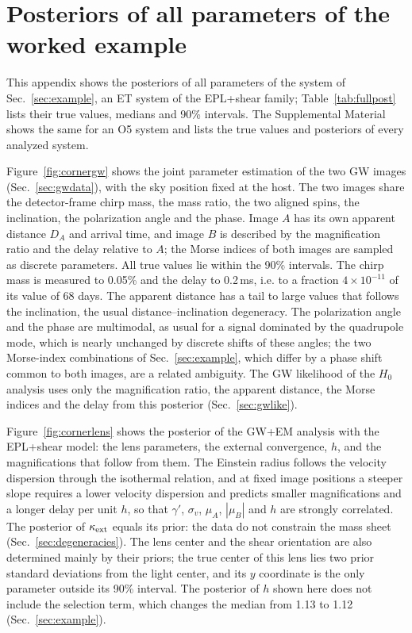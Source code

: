 \section{Posteriors of all parameters of the worked example}
\label{app:example}
This appendix shows the posteriors of all parameters of the system of Sec.~\ref{sec:example}, an ET system of the EPL+shear family; Table~\ref{tab:fullpost} lists their true values, medians and 90\% intervals. The Supplemental Material~\cite{supplement} shows the same for an O5 system and lists the true values and posteriors of every analyzed system.

Figure~\ref{fig:cornergw} shows the joint parameter estimation of the two GW images (Sec.~\ref{sec:gwdata}), with the sky position fixed at the host. The two images share the detector-frame chirp mass, the mass ratio, the two aligned spins, the inclination, the polarization angle and the phase. Image $A$ has its own apparent distance $D_A$ and arrival time, and image $B$ is described by the magnification ratio and the delay relative to $A$; the Morse indices of both images are sampled as discrete parameters. All true values lie within the 90\% intervals. The chirp mass is measured to 0.05\% and the delay to 0.2\,ms, i.e. to a fraction $4\times10^{-11}$ of its value of 68 days. The apparent distance has a tail to large values that follows the inclination, the usual distance--inclination degeneracy. The polarization angle and the phase are multimodal, as usual for a signal dominated by the quadrupole mode, which is nearly unchanged by discrete shifts of these angles; the two Morse-index combinations of Sec.~\ref{sec:example}, which differ by a phase shift common to both images, are a related ambiguity. The GW likelihood of the $H_0$ analysis uses only the magnification ratio, the apparent distance, the Morse indices and the delay from this posterior (Sec.~\ref{sec:gwlike}).

Figure~\ref{fig:cornerlens} shows the posterior of the GW+EM analysis with the EPL+shear model: the lens parameters, the external convergence, $h$, and the magnifications that follow from them. The Einstein radius follows the velocity dispersion through the isothermal relation, and at fixed image positions a steeper slope requires a lower velocity dispersion and predicts smaller magnifications and a longer delay per unit $h$, so that $\gamma'$, $\sigma_v$, $\mu_A$, $|\mu_B|$ and $h$ are strongly correlated. The posterior of $\kappa_{\rm ext}$ equals its prior: the data do not constrain the mass sheet (Sec.~\ref{sec:degeneracies}). The lens center and the shear orientation are also determined mainly by their priors; the true center of this lens lies two prior standard deviations from the light center, and its $y$ coordinate is the only parameter outside its 90\% interval. The posterior of $h$ shown here does not include the selection term, which changes the median from 1.13 to 1.12 (Sec.~\ref{sec:example}).

